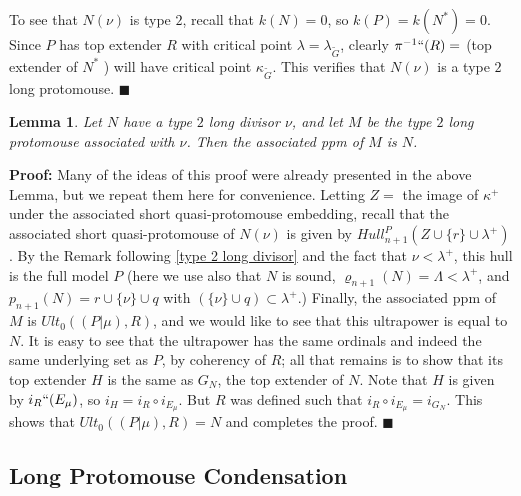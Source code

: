 \documentclass[12pt]{article}
\newtheorem{lem}[thm]{Lemma}
\begin{document}
To see that $N (\nu )$ is type $2$, recall that $k(N) = 0$, so $k(P) = k(N^*) = 0$.  Since $P$ has top extender $R$ with critical point $\lambda = \lambda_{\tilde{G}}$, clearly $\pi^{-1}`` (R) = $ (top extender of $N^*$ ) will have critical point $\kappa_{\tilde{G}}$.  This verifies that $N(\nu)$ is a type $2$ long protomouse.  $\blacksquare$\\


\begin{lem}
Let $N$ have a type $2$ long divisor $\nu$, and let $M$ be the type $2$ long protomouse associated with $\nu$.  Then the associated ppm of $M$ is $N$.
\end{lem}

\textbf{Proof:}  Many of the ideas of this proof were already presented in the above Lemma, but we repeat them here for convenience.  Letting $Z = $ the image of $\kappa^+$ under the associated short quasi-protomouse embedding, recall that the associated short quasi-protomouse of $N(\nu)$ is given by $Hull_{n+1}^P ( Z \cup \{ r \} \cup \lambda^+)$.  By the Remark following \ref{type 2 long divisor} and the fact that $\nu < \lambda^+$, this hull is the full model $P$ (here we use also that $N$ is sound, $\varrho_{n+1} (N) = \Lambda < \lambda^+$, and $p _{n+1}(N) = r \cup \{ \nu \} \cup q$ with $( \{ \nu \} \cup q ) \subset \lambda^+$.)  Finally, the associated ppm of $M$ is $Ult_0 ( (P | \mu), R)$, and we would like to see that this ultrapower is equal to $N$.  It is easy to see that the ultrapower has the same ordinals and indeed the same underlying set as $P$, by coherency of $R$; all that remains is to show that its top extender $H$ is the same as $G_N$, the top extender of $N$.  Note that $H$ is given by $i_R `` ( E_\mu )$, so $i_H = i_R \circ i_{E_\mu}$.  But $R$ was defined such that $i_R \circ i_{E_\mu} = i_{G_N}$.  This shows that $Ult_0 ( (P | \mu), R) = N$ and completes the proof.  $\blacksquare$\\
 
 







\subsection{Long Protomouse Condensation}
\end{document}
